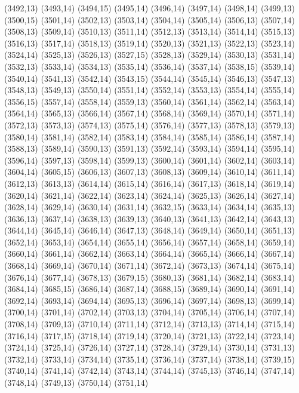 (3492,13)
(3493,14)
(3494,15)
(3495,14)
(3496,14)
(3497,14)
(3498,14)
(3499,13)
(3500,15)
(3501,14)
(3502,13)
(3503,14)
(3504,14)
(3505,14)
(3506,13)
(3507,14)
(3508,13)
(3509,14)
(3510,13)
(3511,14)
(3512,13)
(3513,14)
(3514,14)
(3515,13)
(3516,13)
(3517,14)
(3518,13)
(3519,14)
(3520,13)
(3521,13)
(3522,13)
(3523,14)
(3524,14)
(3525,13)
(3526,13)
(3527,15)
(3528,13)
(3529,14)
(3530,13)
(3531,14)
(3532,13)
(3533,14)
(3534,13)
(3535,14)
(3536,14)
(3537,14)
(3538,15)
(3539,14)
(3540,14)
(3541,13)
(3542,14)
(3543,15)
(3544,14)
(3545,14)
(3546,13)
(3547,13)
(3548,13)
(3549,13)
(3550,14)
(3551,14)
(3552,14)
(3553,13)
(3554,14)
(3555,14)
(3556,15)
(3557,14)
(3558,14)
(3559,13)
(3560,14)
(3561,14)
(3562,14)
(3563,14)
(3564,14)
(3565,13)
(3566,14)
(3567,14)
(3568,14)
(3569,14)
(3570,14)
(3571,14)
(3572,13)
(3573,13)
(3574,13)
(3575,14)
(3576,14)
(3577,13)
(3578,13)
(3579,13)
(3580,14)
(3581,14)
(3582,14)
(3583,14)
(3584,14)
(3585,14)
(3586,14)
(3587,14)
(3588,13)
(3589,14)
(3590,13)
(3591,13)
(3592,14)
(3593,14)
(3594,14)
(3595,14)
(3596,14)
(3597,13)
(3598,14)
(3599,13)
(3600,14)
(3601,14)
(3602,14)
(3603,14)
(3604,14)
(3605,15)
(3606,13)
(3607,13)
(3608,13)
(3609,14)
(3610,14)
(3611,14)
(3612,13)
(3613,13)
(3614,14)
(3615,14)
(3616,14)
(3617,13)
(3618,14)
(3619,14)
(3620,14)
(3621,14)
(3622,14)
(3623,14)
(3624,14)
(3625,13)
(3626,14)
(3627,14)
(3628,14)
(3629,14)
(3630,14)
(3631,14)
(3632,15)
(3633,14)
(3634,14)
(3635,13)
(3636,13)
(3637,14)
(3638,13)
(3639,13)
(3640,13)
(3641,13)
(3642,14)
(3643,13)
(3644,14)
(3645,14)
(3646,14)
(3647,13)
(3648,14)
(3649,14)
(3650,14)
(3651,13)
(3652,14)
(3653,14)
(3654,14)
(3655,14)
(3656,14)
(3657,14)
(3658,14)
(3659,14)
(3660,14)
(3661,14)
(3662,14)
(3663,14)
(3664,14)
(3665,14)
(3666,14)
(3667,14)
(3668,14)
(3669,14)
(3670,14)
(3671,14)
(3672,14)
(3673,13)
(3674,14)
(3675,14)
(3676,14)
(3677,14)
(3678,13)
(3679,15)
(3680,13)
(3681,14)
(3682,14)
(3683,14)
(3684,14)
(3685,15)
(3686,14)
(3687,14)
(3688,15)
(3689,14)
(3690,14)
(3691,14)
(3692,14)
(3693,14)
(3694,14)
(3695,13)
(3696,14)
(3697,14)
(3698,13)
(3699,14)
(3700,14)
(3701,14)
(3702,14)
(3703,13)
(3704,14)
(3705,14)
(3706,14)
(3707,14)
(3708,14)
(3709,13)
(3710,14)
(3711,14)
(3712,14)
(3713,13)
(3714,14)
(3715,14)
(3716,14)
(3717,15)
(3718,14)
(3719,14)
(3720,14)
(3721,13)
(3722,14)
(3723,14)
(3724,14)
(3725,14)
(3726,14)
(3727,14)
(3728,14)
(3729,14)
(3730,14)
(3731,13)
(3732,14)
(3733,14)
(3734,14)
(3735,14)
(3736,14)
(3737,14)
(3738,14)
(3739,15)
(3740,14)
(3741,14)
(3742,14)
(3743,14)
(3744,14)
(3745,13)
(3746,14)
(3747,14)
(3748,14)
(3749,13)
(3750,14)
(3751,14)
